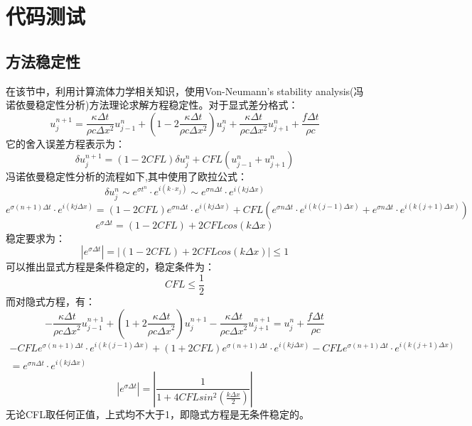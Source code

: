 \documentclass{article}
\begin{document}
		
		\clearpage
		
		\section{代码测试}
		\subsection{方法稳定性}
		在该节中，利用计算流体力学相关知识，使用Von-Neumann's stability analysis(冯诺依曼稳定性分析)方法理论求解方程稳定性。对于显式差分格式：
		$$
		u_j^{n+1}=\frac{\kappa \Delta t}{\rho  c \Delta x^2}u^{n}_{j-1}+(1-2\frac{\kappa \Delta t}{\rho  c \Delta x^2})u^{n}_{j}+\frac{\kappa \Delta t}{\rho  c \Delta x^2}u^{n}_{j+1}+\frac{f \Delta t}{\rho c}
		$$
		它的舍入误差方程表示为：
		$$
		\delta u_j^{n+1}=(1-2CFL)\delta u_j^n + CFL(u^{n}_{j-1}+u^{n}_{j+1})
		$$
		冯诺依曼稳定性分析的流程如下,其中使用了欧拉公式：
		$$
		\delta u_j^n \sim e^{\sigma t^n}\cdot e^{i(k\cdot x_j)} \sim e^{\sigma n\Delta t}\cdot e^{i(kj\Delta x)}
		$$
		$$
		e^{\sigma (n+1)\Delta t}\cdot e^{i(kj\Delta x)}=(1-2CFL)e^{\sigma n\Delta t}\cdot e^{i(kj\Delta x)} + CFL(e^{\sigma n\Delta t}\cdot e^{i(k(j-1)\Delta x)}+e^{\sigma n\Delta t}\cdot e^{i(k(j+1)\Delta x)})
		$$
		$$
		e^{\sigma \Delta t}=(1-2CFL)+2CFLcos(k \Delta x)
		$$
		稳定要求为：
		$$
		|e^{\sigma \Delta t}|=|(1-2CFL)+2CFLcos(k \Delta x)|\leq 1
		$$
		可以推出显式方程是条件稳定的，稳定条件为：
		$$
		CFL \leq \frac{1}{2}
		$$
		而对隐式方程，有：
		$$
		-\frac{\kappa \Delta t}{\rho c {\Delta x}^2}u^{n+1}_{j-1}+(1+2\frac{\kappa \Delta t}{\rho c {\Delta x}^2})u^{n+1}_j-\frac{\kappa \Delta t}{\rho c {\Delta x}^2}u^{n+1}_{j+1}=u^{n}_j+\frac{f\Delta t}{\rho c}
		$$
		$$
		\begin{aligned}
		-CFLe^{\sigma (n+1)\Delta t}\cdot e^{i(k(j-1)\Delta x)}+(1+2CFL)e^{\sigma (n+1)\Delta t}\cdot e^{i(kj\Delta x)}-CFLe^{\sigma (n+1)\Delta t}\cdot e^{i(k(j+1)\Delta x)} \\
		=e^{\sigma n\Delta t}\cdot e^{i(kj\Delta x)}
		\end{aligned}
		$$
		$$
		|e^{\sigma \Delta t}|=|\frac{1}{1+4CFLsin^2(\frac{k\Delta x}{2})}|
		$$
		无论CFL取任何正值，上式均不大于1，即隐式方程是无条件稳定的。
		
\end{document}
